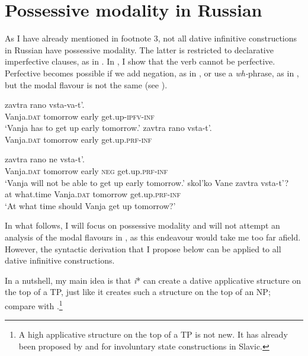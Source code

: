 \documentclass[output=paper,colorlinks,citecolor=brown,nonflat]{./langscibook}
\begin{document}
\section{Possessive modality in Russian}\label{sec:tsedryk:4}

As I have already mentioned in footnote 3, not all dative infinitive constructions in Russian have possessive modality. The latter is restricted to declarative imperfective clauses, as in . In , I show that the verb cannot be perfective. Perfective becomes possible if we add negation, as in , or use a \textit{wh-}phrase, as in , but the modal flavour is not the same (see \citealt{Fortuin2007, Tsedryk2018}).

\ea%
    \label{ex:tsedryk:29}
    \ea\label{ex:tsedryk:29a}
              {zavtra}       {rano}   {vsta-va-t’}.\\
            Vanja.\textsc{dat}  tomorrow  early  get.up-\textsc{ipfv-inf}\\
    \glt    ‘Vanja has to get up early tomorrow.’
    \ex\label{ex:tsedryk:29b}
              {zavtra}       {rano}   {vsta-t’}.\\
            Vanja.\textsc{dat}  tomorrow  early  get.up.\textsc{prf-inf}\\
    \z
\z

\ea%
    \label{ex:tsedryk:30}
    \ea\label{ex:tsedryk:30a}
             {zavtra}       {rano}   {ne}     {vsta-t’}.\\
            Vanja.\textsc{dat}  tomorrow  early  \textsc{neg}    get.up.\textsc{prf-inf}\\
    \glt    ‘Vanja will not be able to get up early tomorrow.’
    \ex\label{ex:tsedryk:30b}
        {skol’ko}       {Vane}           {zavtra}         {vsta-t’}?\\
            at    what.time    Vanja.\textsc{dat}  tomorrow    get.up.\textsc{prf-inf}\\
    \glt    ‘At what time should Vanja get up tomorrow?’
    \z
\z

In what follows, I will focus on possessive modality and will not attempt an analysis of the modal flavours in , as this endeavour would take me too far afield. However, the syntactic derivation that I propose below can be applied to all dative infinitive constructions.  

In a nutshell, my main idea is that \textit{i}* can create a dative applicative structure on the top of a TP, just like it creates such a structure on the top of an NP; compare  with .\footnote{A high applicative structure on the top of a TP is not new. It has already been proposed by \citet{Rivero2009} and \citet{RiveroArregui2012} for involuntary state constructions in Slavic.}      
\end{document}

